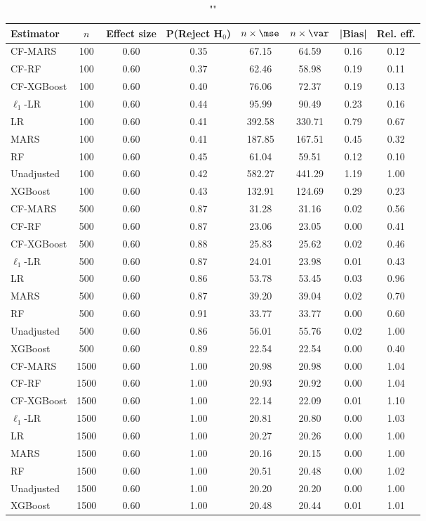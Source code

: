 \begin{table}
\centering
\caption{""}
\begin{tabular}{lccccccc}
\toprule
Estimator & $n$ & Effect size & P(Reject H$_0$) & $n\times\mse$ & $n\times \var$ & |Bias| & Rel. eff.\\ \midrule
CF-MARS & 100 & 0.60 & 0.35 &  67.15 &  64.59 & 0.16 & 0.12 \\ 
CF-RF & 100 & 0.60 & 0.37 &  62.46 &  58.98 & 0.19 & 0.11 \\ 
CF-XGBoost & 100 & 0.60 & 0.40 &  76.06 &  72.37 & 0.19 & 0.13 \\ 
$\ell_1$-LR & 100 & 0.60 & 0.44 &  95.99 &  90.49 & 0.23 & 0.16 \\ 
LR & 100 & 0.60 & 0.41 & 392.58 & 330.71 & 0.79 & 0.67 \\ 
MARS & 100 & 0.60 & 0.41 & 187.85 & 167.51 & 0.45 & 0.32 \\ 
RF & 100 & 0.60 & 0.45 &  61.04 &  59.51 & 0.12 & 0.10 \\ 
Unadjusted & 100 & 0.60 & 0.42 & 582.27 & 441.29 & 1.19 & 1.00 \\ 
XGBoost & 100 & 0.60 & 0.43 & 132.91 & 124.69 & 0.29 & 0.23 \\ \addlinespace 
CF-MARS & 500 & 0.60 & 0.87 &  31.28 &  31.16 & 0.02 & 0.56 \\ 
CF-RF & 500 & 0.60 & 0.87 &  23.06 &  23.05 & 0.00 & 0.41 \\ 
CF-XGBoost & 500 & 0.60 & 0.88 &  25.83 &  25.62 & 0.02 & 0.46 \\ 
$\ell_1$-LR & 500 & 0.60 & 0.87 &  24.01 &  23.98 & 0.01 & 0.43 \\ 
LR & 500 & 0.60 & 0.86 &  53.78 &  53.45 & 0.03 & 0.96 \\ 
MARS & 500 & 0.60 & 0.87 &  39.20 &  39.04 & 0.02 & 0.70 \\ 
RF & 500 & 0.60 & 0.91 &  33.77 &  33.77 & 0.00 & 0.60 \\ 
Unadjusted & 500 & 0.60 & 0.86 &  56.01 &  55.76 & 0.02 & 1.00 \\ 
XGBoost & 500 & 0.60 & 0.89 &  22.54 &  22.54 & 0.00 & 0.40 \\ \addlinespace 
CF-MARS & 1500 & 0.60 & 1.00 &  20.98 &  20.98 & 0.00 & 1.04 \\ 
CF-RF & 1500 & 0.60 & 1.00 &  20.93 &  20.92 & 0.00 & 1.04 \\ 
CF-XGBoost & 1500 & 0.60 & 1.00 &  22.14 &  22.09 & 0.01 & 1.10 \\ 
$\ell_1$-LR & 1500 & 0.60 & 1.00 &  20.81 &  20.80 & 0.00 & 1.03 \\ 
LR & 1500 & 0.60 & 1.00 &  20.27 &  20.26 & 0.00 & 1.00 \\ 
MARS & 1500 & 0.60 & 1.00 &  20.16 &  20.15 & 0.00 & 1.00 \\ 
RF & 1500 & 0.60 & 1.00 &  20.51 &  20.48 & 0.00 & 1.02 \\ 
Unadjusted & 1500 & 0.60 & 1.00 &  20.20 &  20.20 & 0.00 & 1.00 \\ 
XGBoost & 1500 & 0.60 & 1.00 &  20.48 &  20.44 & 0.01 & 1.01 \\
\bottomrule
\end{tabular}
\end{table}

